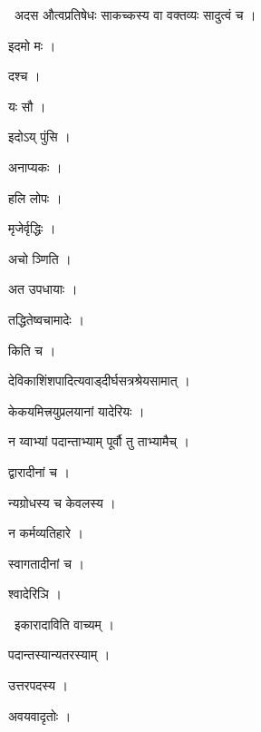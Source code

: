 \documentclass[10pt, openany, oneside]{book}
\begin{document}
\par\noindent\hspace{1.5em}{\vps वा॰}~{\qt अदस औत्वप्रतिषेधः साकच्कस्य वा वक्तव्यः सादुत्वं च ।}

\noindent इदमो मः ।

\noindent दश्च ।

\noindent यः सौ ।

\noindent इदोऽय् पुंसि ।

\noindent अनाप्यकः ।

\noindent हलि लोपः ।

\noindent मृजेर्वृद्धिः ।

\noindent अचो ञ्णिति ।

\noindent अत उपधायाः ।

\noindent तद्धितेष्वचामादेः ।

\noindent किति च ।

\noindent देविकाशिंशपादित्यवाड्दीर्घसत्रश्रेयसामात् ।

\noindent केकयमित्त्रयुप्रलयानां यादेरियः ।

\noindent न य्वाभ्यां पदान्ताभ्याम् पूर्वौ तु ताभ्यामैच् ।

\noindent द्वारादीनां च ।

\noindent न्यग्रोधस्य च केवलस्य ।

\noindent न कर्मव्यतिहारे ।

\noindent स्वागतादीनां च ।

\noindent श्वादेरिञि ।

\par\noindent\hspace{1.5em}{\vps वा॰}~{\qt इकारादाविति वाच्यम् ।}

\noindent पदान्तस्यान्यतरस्याम् ।

\noindent उत्तरपदस्य ।

\noindent अवयवादृतोः ।
\end{document}
